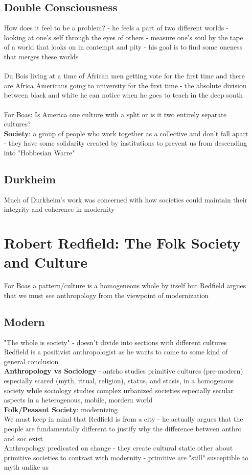 \documentclass{article}
\begin{document}
\subsection{Double Consciousness}
How does it feel to be a problem? - he feels a part of two different worlds - looking at one's self through the eyes of others - measure one's soul by the tape of a world that looks on in contempt and pity - his goal is to find some oneness that merges these worlds \\ \\
Du Bois living at a time of African men getting vote for the first time and there are Africa Americans going to university for the first time - the absolute division between black and white he can notice when he goes to teach in the deep south \\ \\
For Boas: Is America one culture with a split or is it two entirely separate cultures? \\
\textbf{Society}: a group of people who work together as a collective and don't fall apart - they have some solidarity created by institutions to prevent us from descending into "Hobbesian Warre"

\subsection{Durkheim}
Much of Durkheim's work was concerned with how societies could maintain their integrity and coherence in modernity

\section{Robert Redfield: The Folk Society and Culture}
For Boas a pattern/culture is a homogeneous whole by itself but Redfield argues that we must see anthropology from the viewpoint of modernization \\
\subsection{Modern}
"The whole is society" - doesn't divide into sections with different cultures \\
Redfield is a positivist anthropologist as he wants to come to some kind of general conclusion \\
\textbf{Anthropology vs Sociology} - antrho studies primitive cultures (pre-modern) especially scared (myth, ritual, religion), status, and stasis, in a homogenous society while sociology studies complex urbanized societies especially secular aspects in a heterogenous, mobile, mordern world \\
\textbf{Folk/Peasant Society}: modernizing \\
We must keep in mind that Redfield is from a city - he actually argues that the people are fundamentally different to justify why the difference between anthro and soc exist \\ 
Anthropology predicated on change - they create cultural static other about primitive societies to contrast with modernity - primitive are "still" susceptible to myth unlike us
\end{document}
